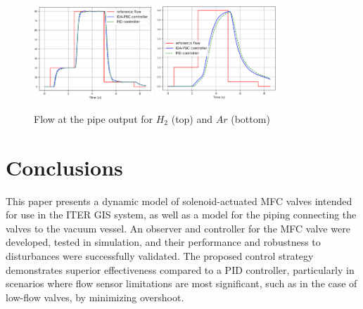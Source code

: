 \documentclass[letterpaper, 10pt, conference]{ieeeconf}
\begin{document}
\begin{figure}[!ht]
    \centering
    \includegraphics[width=0.4\textwidth]{ctrlsteps_H2_pipeout.png}
    \includegraphics[width=0.4\textwidth]{ctrlsteps_Ar_pipeout.png}
    \caption{Flow at the pipe output for $H_2$ (top) and $Ar$ (bottom)}
    \label{fig:ctrlstep_pipeout}
\end{figure}


\section{Conclusions}\label{sec:conclusion}
This paper presents a dynamic model of solenoid-actuated MFC valves intended for use in the ITER GIS system, as well as a model for the piping connecting the valves to the vacuum vessel. An observer and controller for the MFC valve were developed, tested in simulation, and their performance and robustness to disturbances were successfully validated. The proposed control strategy demonstrates superior effectiveness compared to a PID controller, particularly in scenarios where flow sensor limitations are most significant, such as in the case of low-flow valves, by minimizing overshoot.

 
\end{document}
